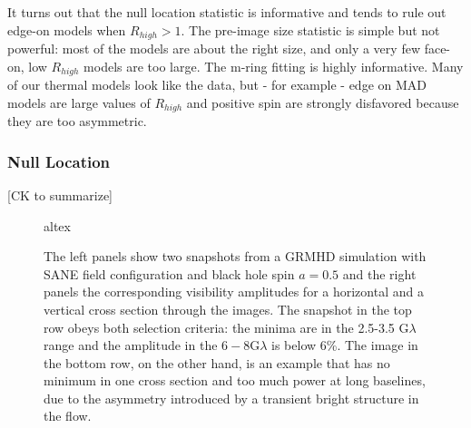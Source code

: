 It turns out that the null location statistic is informative and tends to rule out edge-on models when $R_{high} > 1$.  The pre-image size statistic is simple but not powerful: most of the models are about the right size, and only a very few face-on, low $R_{high}$ models are too large.   The m-ring fitting is highly informative.  Many of our thermal models look like the data, but - for example - edge on MAD models are large values of $R_{high}$ and positive spin are strongly disfavored because they are too asymmetric.

\subsubsection{Null Location}

[CK to summarize]


\begin{figure}
  altex
  \caption{\footnotesize The left panels show two snapshots from a
    GRMHD simulation with SANE field configuration and black hole spin $a=0.5$
    and the right panels the corresponding
    visibility amplitudes for a horizontal and a vertical cross
    section through the images. The snapshot in the top row obeys both
    selection criteria: the minima are in the 2.5-3.5 G$\lambda$ range
    and the amplitude in the $6-8$G$\lambda$ is below 6\%. The image in
    the bottom row, on the other hand, is an example that has no minimum
    in one cross section and too much power at long baselines, due to
    the asymmetry introduced by a transient bright structure in the flow. }
  \label{fig:VA}
\end{figure}

